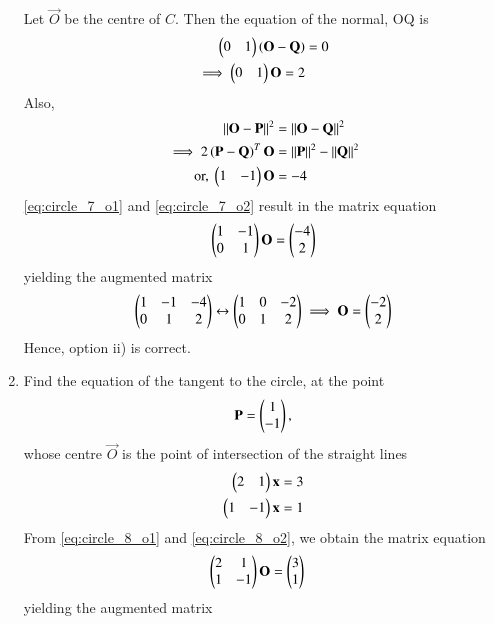 \documentclass[journal,12pt,twocolumn]{IEEEtran}
\begin{document}
\begin{enumerate}[label=\arabic*]
\solution Let $\vec{O}$ be the centre of $C$. Then the equation of the normal, OQ is
\begin{align}
\begin{pmatrix}0 & 1\end{pmatrix}\left(\mathbf{O}-\mathbf{Q}\right) &= 0
\nonumber \\ 
\implies \begin{pmatrix}0 & 1\end{pmatrix}\mathbf{O} = 2
\label{eq:circle_7_o1}
\end{align}
%
Also, 
\begin{align}
\left\Vert\mathbf{O}-\mathbf{P}\right\Vert^2&=\left\Vert\mathbf{O}-\mathbf{Q}\right\Vert^2 
\nonumber \\
\implies 2\left(\mathbf{P}-\mathbf{Q}\right)^T\mathbf{O} &= \left\Vert\mathbf{P}\right\Vert^2-\left\Vert\mathbf{Q}\right\Vert^2 
\nonumber \\
\text{or, } \begin{pmatrix}1 & -1\end{pmatrix}\mathbf{O} &= -4
\label{eq:circle_7_o2}
\end{align}
%
\eqref{eq:circle_7_o1} and \eqref{eq:circle_7_o2} result in the matrix equation
\begin{align}
\begin{pmatrix}1 & -1 \\ 0 & 1\end{pmatrix}\mathbf{O} = \begin{pmatrix}-4\\2\end{pmatrix}
\label{eq:circle_7_matrix}
\end{align}
yielding the augmented matrix
\begin{align}
\begin{pmatrix}1 & -1 & -4\\ 0 & 1 & 2\end{pmatrix} \leftrightarrow \begin{pmatrix}1 & 0 & -2\\ 0 & 1 & 2\end{pmatrix}\implies \mathbf{O} = \begin{pmatrix}-2 \\2\end{pmatrix}
\label{eq:circle_7_o}
\end{align}
Hence, option ii)  is correct.
\item Find the equation of the tangent to the circle, at the point
\begin{equation}
\mathbf{P}=\begin{pmatrix}1\\ -1\end{pmatrix},
\end{equation}
whose centre $\vec{O}$ is the point of intersection of the straight lines
\begin{align} 
\label{eq:circle_8_o1}
\begin{pmatrix}2 & 1\end{pmatrix}\mathbf{x} &= 3
\\
\begin{pmatrix}1 & -1\end{pmatrix}\mathbf{x} &= 1
\label{eq:circle_8_o2}
\end{align} 
\solution From \eqref{eq:circle_8_o1} and \eqref{eq:circle_8_o2}, we obtain the matrix equation
\begin{align} 
\begin{pmatrix}2 & 1\\1 & -1\end{pmatrix}\mathbf{O} &= \begin{pmatrix}3 \\ 1\end{pmatrix}
\end{align} 
yielding the augmented matrix
\begin{align} 

\end{align}
\end{enumerate}
\end{document}
